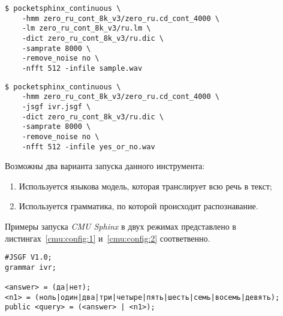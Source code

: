 \begin{minipage}{\linewidth}
\begin{lstlisting}[caption={Запуск \textit{CMU Sphinx}. Вариант 1},label={cmu:config:1}]
$ pocketsphinx_continuous \
    -hmm zero_ru_cont_8k_v3/zero_ru.cd_cont_4000 \
    -lm zero_ru_cont_8k_v3/ru.lm \
    -dict zero_ru_cont_8k_v3/ru.dic \
    -samprate 8000 \
    -remove_noise no \
    -nfft 512 -infile sample.wav
\end{lstlisting}
\end{minipage}

\begin{minipage}{\linewidth}
\begin{lstlisting}[caption={Запуск \textit{CMU Sphinx}. Вариант 2},label={cmu:config:2}]
$ pocketsphinx_continuous \
    -hmm zero_ru_cont_8k_v3/zero_ru.cd_cont_4000 \
    -jsgf ivr.jsgf \
    -dict zero_ru_cont_8k_v3/ru.dic \
    -samprate 8000 \
    -remove_noise no \
    -nfft 512 -infile yes_or_no.wav
\end{lstlisting}
\end{minipage}

Возможны два варианта запуска данного инструмента:
\begin{enumerate}
    \item Используется языкова модель, которая транслирует всю речь в текст;
    \item Используется грамматика, по которой происходит распознавание.
\end{enumerate}

Примеры запуска \textit{CMU Sphinx} в двух режимах представлено в
листингах~\ref{cmu:config:1} и~\ref{cmu:config:2} соответвенно.\\

\begin{minipage}{\linewidth}
\label{cmu:jsgf}
\begin{Verbatim}[fontsize=\footnotesize]
#JSGF V1.0;
grammar ivr;

<answer> = (да|нет);
<n1> = (ноль|один|два|три|четыре|пять|шесть|семь|восемь|девять);
public <query> = (<answer> | <n1>);

\end{Verbatim}
\end{minipage}

